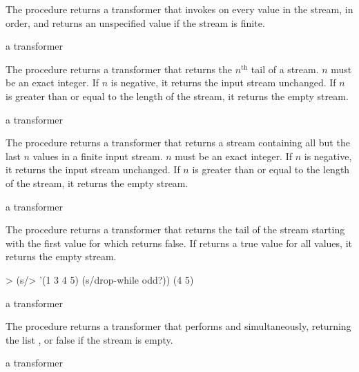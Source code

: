 The  procedure returns a transformer that invokes  on every
value in the stream, in order, and returns an unspecified value if the stream is finite.

\begin{procedure}
\end{procedure}
\returns{} a transformer

The  procedure returns a transformer that returns the $n^\textrm{th}$ tail of
a stream. $n$ must be an exact integer. If $n$ is negative, it returns the input stream
unchanged. If $n$ is greater than or equal to the length of the stream, it returns the
empty stream.

\begin{procedure}
\end{procedure}
\returns{} a transformer

The  procedure returns a transformer that returns a stream containing
all but the last $n$ values in a finite input stream. $n$ must be an exact integer. If $n$
is negative, it returns the input stream unchanged. If $n$ is greater than or equal to the
length of the stream, it returns the empty stream.

\begin{procedure}
\end{procedure}
\returns{} a transformer

The  procedure returns a transformer that returns the tail of the
stream starting with the first value for which  returns false. If
 returns a true value for all values, it returns the empty stream.

\codebegin
> (s/> '(1 3 4 5) (s/drop-while odd?))
(4 5)
\codeend

\begin{procedure}
\end{procedure}
\returns{} a transformer

The  procedure returns a transformer that performs  and
 simultaneously, returning the list , or false if
the stream is empty.

\begin{procedure}
\end{procedure}
\returns{} a transformer

